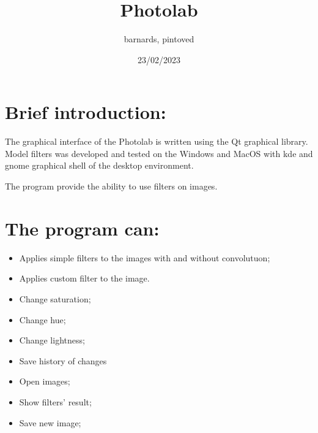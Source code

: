 \documentclass[12pt]{article}
\title{Photolab}
\author{barnards, pintoved}
\date{23/02/2023}
\begin{document}
\maketitle

\newpage
\section{Brief introduction:}
The graphical interface of the Photolab is written using the Qt graphical library.
Model filters was developed and tested on the Windows and MacOS with kde and gnome graphical shell of the desktop environment.

The program provide the ability to use filters on images.

\section{The program can:}
\begin{itemize}
  \item Applies simple filters to the images with and without convolutuon;
  \item Applies custom filter to the image.
  \item Change saturation;
  \item Change hue;
  \item Change lightness;
  \item Save history of changes 
  \item Open images;
  \item Show filters' result;
  \item Save new image;
\end{itemize}
\end{document}
